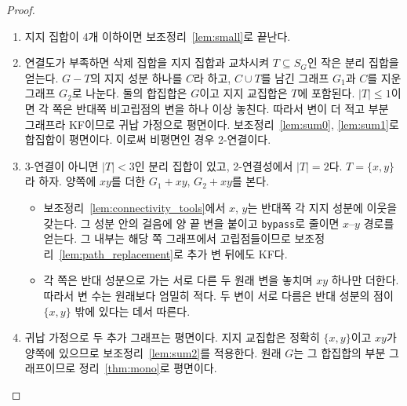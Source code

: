 \begin{proof}
\leanok
\begin{enumerate}
  \item 지지 집합이 4개 이하이면 보조정리~\ref{lem:small}로 끝난다.
  \item 연결도가 부족하면 삭제 집합을 지지 집합과 교차시켜 \(T \subseteq S_G\)인 작은 분리 집합을 얻는다.
        \(G-T\)의 지지 성분 하나를 \(C\)라 하고, \(C\cup T\)를 남긴 그래프 \(G_1\)과 \(C\)를 지운
        그래프 \(G_2\)로 나눈다. 둘의 합집합은 \(G\)이고 지지 교집합은 \(T\)에 포함된다.
        \(|T| \le 1\)이면 각 쪽은 반대쪽 비고립점의 변을 하나 이상 놓친다. 따라서 변이 더 적고 부분 그래프라
        KF이므로 귀납 가정으로 평면이다. 보조정리~\ref{lem:sum0}, \ref{lem:sum1}로 합집합이 평면이다.
        이로써 비평면인 경우 2-연결이다.
  \item 3-연결이 아니면 \(|T|<3\)인 분리 집합이 있고, 2-연결성에서 \(|T|=2\)다. \(T=\{x,y\}\)라 하자.
        양쪽에 \(xy\)를 더한 \(G_1+xy\), \(G_2+xy\)를 본다.
    \begin{itemize}
      \item 보조정리~\ref{lem:connectivity_tools}에서 \(x\), \(y\)는 반대쪽 각 지지 성분에 이웃을 갖는다.
            그 성분 안의 걸음에 양 끝 변을 붙이고 \texttt{bypass}로 줄이면 \(x\)--\(y\) 경로를 얻는다.
            그 내부는 해당 쪽 그래프에서 고립점들이므로 보조정리~\ref{lem:path_replacement}로 추가 변 뒤에도 KF다.
      \item 각 쪽은 반대 성분으로 가는 서로 다른 두 원래 변을 놓치며 \(xy\) 하나만 더한다. 따라서 변 수는
            원래보다 엄밀히 적다. 두 변이 서로 다름은 반대 성분의 점이 \(\{x,y\}\) 밖에 있다는 데서 따른다.
    \end{itemize}
  \item 귀납 가정으로 두 추가 그래프는 평면이다. 지지 교집합은 정확히 \(\{x,y\}\)이고 \(xy\)가 양쪽에
        있으므로 보조정리~\ref{lem:sum2}를 적용한다. 원래 \(G\)는 그 합집합의 부분 그래프이므로
        정리~\ref{thm:mono}로 평면이다.
\end{enumerate}
\end{proof}
